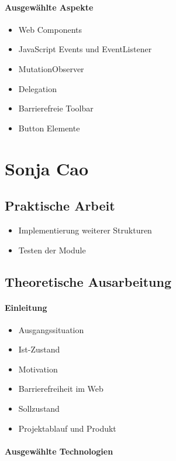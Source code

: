 \paragraph{Ausgewählte Aspekte}

\begin{itemize}
	\item Web Components
	\item JavaScript Events und EventListener
	\item MutationObserver
	\item Delegation
	\item Barrierefreie Toolbar
	\item Button Elemente
\end{itemize}

\section{Sonja Cao}

\subsection{Praktische Arbeit}

\begin{itemize}
	\item Implementierung weiterer Strukturen 
	\item Testen der Module
\end{itemize}

\subsection{Theoretische Ausarbeitung}

\paragraph{Einleitung}

\begin{itemize}
	\item Ausgangssituation
	\item Ist-Zustand
	\item Motivation
	\item Barrierefreiheit im Web
	\item Sollzustand
	\item Projektablauf und Produkt
\end{itemize}

\paragraph{Ausgewählte Technologien}


